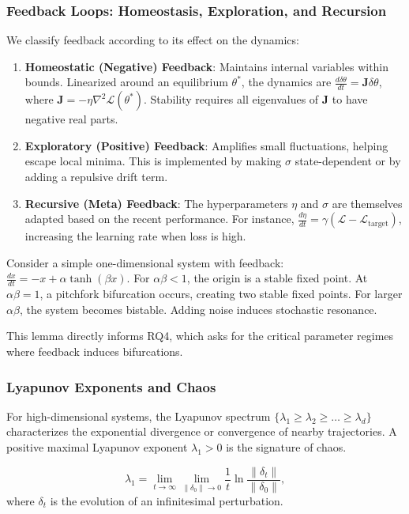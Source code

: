 \subsubsection{Feedback Loops: Homeostasis, Exploration, and Recursion}
We classify feedback according to its effect on the dynamics:

\begin{enumerate}
    \item \textbf{Homeostatic (Negative) Feedback}: Maintains internal variables within bounds. Linearized around an equilibrium $\theta^*$, the dynamics are $\frac{d\delta\theta}{dt} = \mathbf{J} \delta\theta$, where $\mathbf{J} = -\eta \nabla^2 \mathcal{L}(\theta^*)$. Stability requires all eigenvalues of $\mathbf{J}$ to have negative real parts.
    \item \textbf{Exploratory (Positive) Feedback}: Amplifies small fluctuations, helping escape local minima. This is implemented by making $\sigma$ state-dependent or by adding a repulsive drift term.
    \item \textbf{Recursive (Meta) Feedback}: The hyperparameters $\eta$ and $\sigma$ are themselves adapted based on the recent performance. For instance, $\frac{d\eta}{dt} = \gamma (\mathcal{L} - \mathcal{L}_{\text{target}})$, increasing the learning rate when loss is high.
\end{enumerate}

\begin{lemma}
Consider a simple one-dimensional system with feedback: $\frac{dx}{dt} = -x + \alpha \tanh(\beta x)$. For $\alpha \beta < 1$, the origin is a stable fixed point. At $\alpha \beta = 1$, a pitchfork bifurcation occurs, creating two stable fixed points. For larger $\alpha\beta$, the system becomes bistable. Adding noise induces stochastic resonance.
\end{lemma}
This lemma directly informs RQ4, which asks for the critical parameter regimes where feedback induces bifurcations.

\subsubsection{Lyapunov Exponents and Chaos}
For high-dimensional systems, the Lyapunov spectrum $\{\lambda_1 \ge \lambda_2 \ge \dots \ge \lambda_d\}$ characterizes the exponential divergence or convergence of nearby trajectories. A positive maximal Lyapunov exponent $\lambda_1 > 0$ is the signature of chaos.

\begin{definition}
\[
\lambda_1 = \lim_{t \to \infty} \lim_{\|\delta_0\| \to 0} \frac{1}{t} \ln \frac{\|\delta_t\|}{\|\delta_0\|},
\]
where $\delta_t$ is the evolution of an infinitesimal perturbation.
\end{definition}


